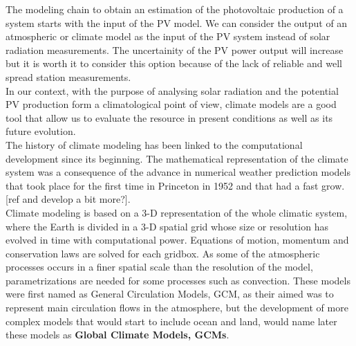 The modeling chain to obtain an estimation of the photovoltaic production of a system starts with the input of the PV model. We can consider the output of an atmospheric or climate model as the input of the PV system instead of solar radiation measurements. The uncertainity of the PV power output will increase but it is worth it to consider this option because of the lack of reliable and well spread station measurements.\\  
 

In our context, with the purpose of analysing solar radiation and the potential PV production form a climatological point of view, climate models are a good tool that allow us to evaluate the resource in present conditions as well as its future evolution.\\

The history of climate modeling has been linked to the computational development since its beginning. The mathematical representation of the climate system was a consequence of the advance in numerical weather prediction models that took place for the first time in Princeton in 1952 and that had a fast grow. [ref and {\color{red}develop a bit more?}].\\

Climate modeling is based on a 3-D representation of the whole climatic system, where the Earth is divided  in a 3-D spatial grid whose size or resolution has evolved in time with computational power. Equations of motion, momentum and conservation laws are solved for each gridbox. As some of the atmospheric processes occurs in a finer spatial scale than the resolution of the model, parametrizations are needed for some processes such as convection. These models were first named as General Circulation Models, GCM, as their aimed was to represent main circulation flows in the atmosphere, but the development of more complex models that would start to include ocean and land, would name later these models as \textbf{Global Climate Models, GCMs}. \\

